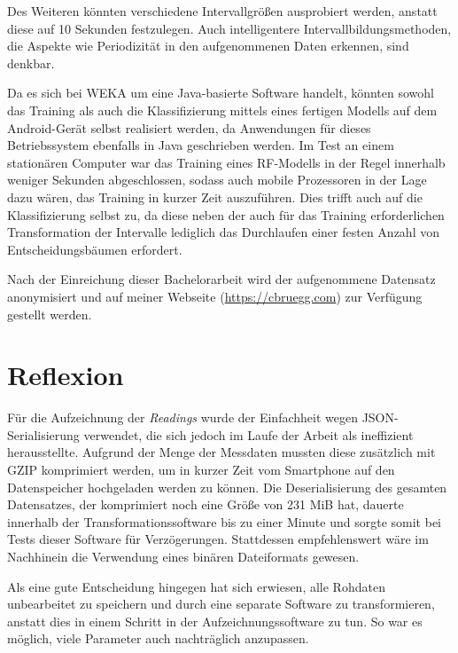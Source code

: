 Des Weiteren könnten verschiedene Intervallgrößen ausprobiert werden, anstatt diese auf 10 Sekunden festzulegen. Auch intelligentere Intervallbildungsmethoden, die Aspekte wie Periodizität in den aufgenommenen Daten erkennen, sind denkbar.

Da es sich bei WEKA um eine Java-basierte Software handelt, könnten sowohl das Training als auch die Klassifizierung mittels eines fertigen Modells auf dem Android-Gerät selbst realisiert werden, da Anwendungen für dieses Betriebssystem ebenfalls in Java geschrieben werden. Im Test an einem stationären Computer war das Training eines RF-Modells in der Regel innerhalb weniger Sekunden abgeschlossen, sodass auch mobile Prozessoren in der Lage dazu wären, das Training in kurzer Zeit auszuführen. Dies trifft auch auf die Klassifizierung selbst zu, da diese neben der auch für das Training erforderlichen Transformation der Intervalle lediglich das Durchlaufen einer festen Anzahl von Entscheidungsbäumen erfordert.

Nach der Einreichung dieser Bachelorarbeit wird der aufgenommene Datensatz anonymisiert und auf meiner Webseite (\url{https://cbruegg.com}) zur Verfügung gestellt werden.

\section{Reflexion}
Für die Aufzeichnung der \textit{Readings} wurde der Einfachheit wegen JSON-Serialisierung verwendet, die sich jedoch im Laufe der Arbeit als ineffizient herausstellte. Aufgrund der Menge der Messdaten mussten diese zusätzlich mit GZIP komprimiert werden, um in kurzer Zeit vom Smartphone auf den Datenspeicher hochgeladen werden zu können. Die Deserialisierung des gesamten Datensatzes, der komprimiert noch eine Größe von 231 MiB hat, dauerte innerhalb der Transformationssoftware bis zu einer Minute und sorgte somit bei Tests dieser Software für Verzögerungen. Stattdessen empfehlenswert wäre im Nachhinein die Verwendung eines binären Dateiformats gewesen.

Als eine gute Entscheidung hingegen hat sich erwiesen, alle Rohdaten unbearbeitet zu speichern und durch eine separate Software zu transformieren, anstatt dies in einem Schritt in der Aufzeichnungssoftware zu tun. So war es möglich, viele Parameter auch nachträglich anzupassen.


